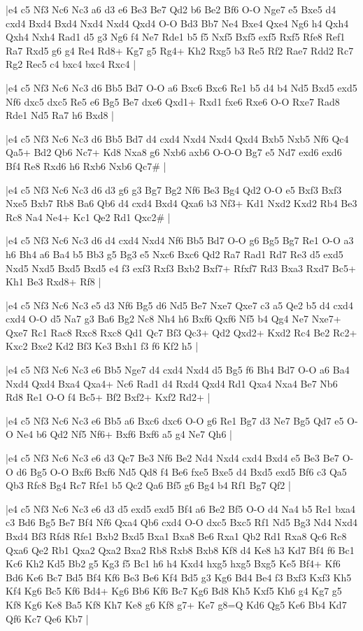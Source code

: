 \whitename{}
\blackname{}
\makegametitle
|e4 c5 Nf3 Nc6 Nc3 a6 d3 e6 Be3 Be7 Qd2 b6 Be2 Bf6 O-O Nge7 e5 Bxe5 d4 cxd4 Bxd4 Bxd4 Nxd4 Nxd4 Qxd4 O-O Bd3 Bb7 Ne4 Bxe4 Qxe4 Ng6 h4 Qxh4 Qxh4 Nxh4 Rad1 d5 g3 Ng6 f4 Ne7 Rde1 b5 f5 Nxf5 Bxf5 exf5 Rxf5 Rfe8 Ref1 Ra7 Rxd5 g6 g4 Re4 Rd8+ Kg7 g5 Rg4+ Kh2 Rxg5 b3 Re5 Rf2 Rae7 Rdd2 Rc7 Rg2 Rec5 c4 bxc4 bxc4 Rxc4  |

\whitename{}
\blackname{}
\makegametitle
|e4 c5 Nf3 Nc6 Nc3 d6 Bb5 Bd7 O-O a6 Bxc6 Bxc6 Re1 b5 d4 b4 Nd5 Bxd5 exd5 Nf6 dxc5 dxc5 Re5 e6 Bg5 Be7 dxe6 Qxd1+ Rxd1 fxe6 Rxe6 O-O Rxe7 Rad8 Rde1 Nd5 Ra7 h6 Bxd8  |

\whitename{}
\blackname{}
\makegametitle
|e4 c5 Nf3 Nc6 Nc3 d6 Bb5 Bd7 d4 cxd4 Nxd4 Nxd4 Qxd4 Bxb5 Nxb5 Nf6 Qc4 Qa5+ Bd2 Qb6 Nc7+ Kd8 Nxa8 g6 Nxb6 axb6 O-O-O Bg7 e5 Nd7 exd6 exd6 Bf4 Re8 Rxd6 h6 Rxb6 Nxb6 Qc7\#  |

\whitename{}
\blackname{}
\makegametitle
|e4 c5 Nf3 Nc6 Nc3 d6 d3 g6 g3 Bg7 Bg2 Nf6 Be3 Bg4 Qd2 O-O e5 Bxf3 Bxf3 Nxe5 Bxb7 Rb8 Ba6 Qb6 d4 cxd4 Bxd4 Qxa6 b3 Nf3+ Kd1 Nxd2 Kxd2 Rb4 Be3 Rc8 Na4 Ne4+ Kc1 Qe2 Rd1 Qxc2\#  |

\whitename{}
\blackname{}
\makegametitle
|e4 c5 Nf3 Nc6 Nc3 d6 d4 cxd4 Nxd4 Nf6 Bb5 Bd7 O-O g6 Bg5 Bg7 Re1 O-O a3 h6 Bh4 a6 Ba4 b5 Bb3 g5 Bg3 e5 Nxc6 Bxc6 Qd2 Ra7 Rad1 Rd7 Re3 d5 exd5 Nxd5 Nxd5 Bxd5 Bxd5 e4 f3 exf3 Rxf3 Bxb2 Bxf7+ Rfxf7 Rd3 Bxa3 Rxd7 Bc5+ Kh1 Be3 Rxd8+ Rf8  |

\whitename{}
\blackname{}
\makegametitle
|e4 c5 Nf3 Nc6 Nc3 e5 d3 Nf6 Bg5 d6 Nd5 Be7 Nxe7 Qxe7 c3 a5 Qe2 b5 d4 cxd4 cxd4 O-O d5 Na7 g3 Ba6 Bg2 Nc8 Nh4 h6 Bxf6 Qxf6 Nf5 b4 Qg4 Ne7 Nxe7+ Qxe7 Rc1 Rac8 Rxc8 Rxc8 Qd1 Qc7 Bf3 Qc3+ Qd2 Qxd2+ Kxd2 Rc4 Be2 Rc2+ Kxc2 Bxe2 Kd2 Bf3 Ke3 Bxh1 f3 f6 Kf2 h5  |

\whitename{}
\blackname{}
\makegametitle
|e4 c5 Nf3 Nc6 Nc3 e6 Bb5 Nge7 d4 cxd4 Nxd4 d5 Bg5 f6 Bh4 Bd7 O-O a6 Ba4 Nxd4 Qxd4 Bxa4 Qxa4+ Nc6 Rad1 d4 Rxd4 Qxd4 Rd1 Qxa4 Nxa4 Be7 Nb6 Rd8 Re1 O-O f4 Bc5+ Bf2 Bxf2+ Kxf2 Rd2+  |

\whitename{}
\blackname{}
\makegametitle
|e4 c5 Nf3 Nc6 Nc3 e6 Bb5 a6 Bxc6 dxc6 O-O g6 Re1 Bg7 d3 Ne7 Bg5 Qd7 e5 O-O Ne4 b6 Qd2 Nf5 Nf6+ Bxf6 Bxf6 a5 g4 Ne7 Qh6  |

\whitename{}
\blackname{}
\makegametitle
|e4 c5 Nf3 Nc6 Nc3 e6 d3 Qc7 Be3 Nf6 Be2 Nd4 Nxd4 cxd4 Bxd4 e5 Be3 Be7 O-O d6 Bg5 O-O Bxf6 Bxf6 Nd5 Qd8 f4 Be6 fxe5 Bxe5 d4 Bxd5 exd5 Bf6 c3 Qa5 Qb3 Rfc8 Bg4 Rc7 Rfe1 b5 Qc2 Qa6 Bf5 g6 Bg4 b4 Rf1 Bg7 Qf2  |

\whitename{}
\blackname{}
\makegametitle
|e4 c5 Nf3 Nc6 Nc3 e6 d3 d5 exd5 exd5 Bf4 a6 Be2 Bf5 O-O d4 Na4 b5 Re1 bxa4 c3 Bd6 Bg5 Be7 Bf4 Nf6 Qxa4 Qb6 cxd4 O-O dxc5 Bxc5 Rf1 Nd5 Bg3 Nd4 Nxd4 Bxd4 Bf3 Rfd8 Rfe1 Bxb2 Bxd5 Bxa1 Bxa8 Be6 Rxa1 Qb2 Rd1 Rxa8 Qc6 Rc8 Qxa6 Qe2 Rb1 Qxa2 Qxa2 Bxa2 Rb8 Rxb8 Bxb8 Kf8 d4 Ke8 h3 Kd7 Bf4 f6 Bc1 Kc6 Kh2 Kd5 Bb2 g5 Kg3 f5 Bc1 h6 h4 Kxd4 hxg5 hxg5 Bxg5 Ke5 Bf4+ Kf6 Bd6 Ke6 Bc7 Bd5 Bf4 Kf6 Be3 Be6 Kf4 Bd5 g3 Kg6 Bd4 Be4 f3 Bxf3 Kxf3 Kh5 Kf4 Kg6 Bc5 Kf6 Bd4+ Kg6 Bb6 Kf6 Bc7 Kg6 Bd8 Kh5 Kxf5 Kh6 g4 Kg7 g5 Kf8 Kg6 Ke8 Ba5 Kf8 Kh7 Ke8 g6 Kf8 g7+ Ke7 g8=Q Kd6 Qg5 Ke6 Bb4 Kd7 Qf6 Kc7 Qe6 Kb7  |

